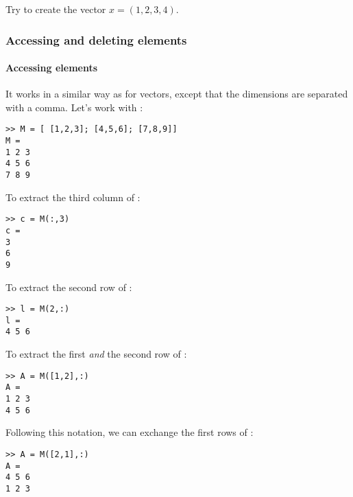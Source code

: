 Try to create the vector $x = (1,2,3,4)$.



\subsubsection{Accessing and deleting elements}

\paragraph{Accessing elements}
It works in a similar way as for vectors, except that the dimensions are separated with a comma.
Let's work with :
\begin{lstlisting}
>> M = [ [1,2,3]; [4,5,6]; [7,8,9]]
M = 
1 2 3
4 5 6
7 8 9
\end{lstlisting}

To extract the third column of :

\begin{lstlisting}
>> c = M(:,3)
c = 
3
6
9
\end{lstlisting}


To extract the second row of :

\begin{lstlisting}
>> l = M(2,:)
l = 
4 5 6
\end{lstlisting}

To extract the first \emph{and} the second row of :
\begin{lstlisting}
>> A = M([1,2],:)
A = 
1 2 3
4 5 6
\end{lstlisting}

Following this notation, we can exchange the first rows of :
\begin{lstlisting}
>> A = M([2,1],:)
A = 
4 5 6
1 2 3
\end{lstlisting}





